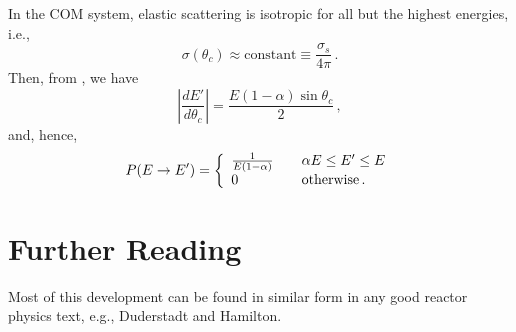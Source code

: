 In the COM system, elastic scattering is isotropic for all
but the highest energies, i.e.,
\begin{equation}
  \sigma(\theta_c) \approx \text{constant} \equiv \frac{\sigma_{s}}{4\pi} \, .
\end{equation}
Then, from , we have
\begin{equation}
 \left | \frac{dE'}{d\theta_c} \right | = \frac{ E (1-\alpha) \sin \theta_c}{2} \, ,
\end{equation}
and, hence, 
\begin{equation}
      P(E\to E') =
        \left\{
           \begin{array}{l l}
               \frac{1}{E(1-\alpha)} & \quad \alpha E \leq E' \leq E \\
               0                     & \quad \text{otherwise} \, .
            \end{array} 
        \right.
    \label{eq:scatter_probability}
\end{equation}

\section*{Further Reading}

Most of this development can be found in similar form in any good 
reactor physics text, e.g., Duderstadt and Hamilton\cite{duderstadt1976nra}.


